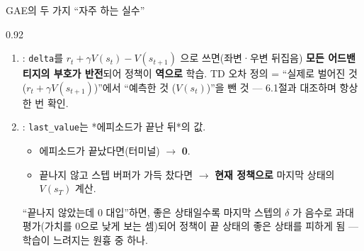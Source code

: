 \begin{frame}{GAE의 두 가지 ``자주 하는 실수''}
\begin{center}\begin{varwidth}{0.92\textwidth}
  \small
  \begin{enumerate}
    \item {}: \texttt{delta}를
      $r_t+\gamma V(s_t)-V(s_{t+1})$ 으로 쓰면(좌변·우변
      뒤집음) \textbf{모든 어드밴티지의 부호가 반전}되어
      정책이 \textbf{역으로} 학습.
      \smallskip
      {\footnotesize TD 오차 정의 = ``실제로 벌어진 것
      ($r_t+\gamma V(s_{t+1})$)''에서 ``예측한 것
      ($V(s_t)$)''을 뺀 것 — 6.1절과 대조하며 항상 한 번
      확인.}
    \item {}:
      \texttt{last\_value}는 *에피소드가 끝난 뒤*의 값.
      \begin{itemize}
        \item 에피소드가 끝났다면(터미널) $\to$ \textbf{0}.
        \item 끝나지 않고 스텝 버퍼가 가득 찼다면 $\to$
          \textbf{현재 정책으로} 마지막 상태의 $V(s_T)$ 계산.
      \end{itemize}
      ``끝나지 않았는데 0 대입''하면, 좋은 상태일수록 마지막
      스텝의 $\delta$ 가 음수로 과대평가(가치를 0으로 낮게
      보는 셈)되어 정책이 끝 상태의 좋은 상태를 피하게 됨 —
      학습이 느려지는 원흉 중 하나.
  \end{enumerate}
\end{varwidth}\end{center}
\end{frame}
